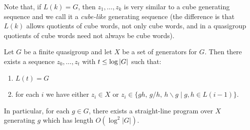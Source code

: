 \documentclass{theoretics}
\newcommand{\abs}[1]{\left|\mathinner{#1}\right|}
\begin{document}
Note that, if $L(k) = G$, then $z_1,\dotsc,z_k$ is very similar to a cube generating sequence and we call it a  \emph{cube-like} generating sequence (the difference is that $L(k)$ allows quotients of cube words, not only cube words, and in a quasigroup quotients of cube words need not always be cube words). 

\begin{lemma}\label{extendedReachability} 
Let $G$ be a finite quasigroup and let $X$ be a set of generators for $G$. Then there exists a sequence $z_0, \dots, z_t$ with $t\leq \log \abs{G}$ such that:
\begin{enumerate}[label*=(\arabic*)]
    \item $L(t) = G$
    \item\label{zinL} for each $i$ we have either $z_i \in X$ or $z_i \in \{ gh,\, g/h,\, h\backslash g\mid g,h \in L(i-1) \}$.
\end{enumerate}
In particular, for each $g \in G$, there exists a straight-line program over $X$ generating $g$ which has length $O(\log^2 |G|)$.
\end{lemma}
\end{document}
